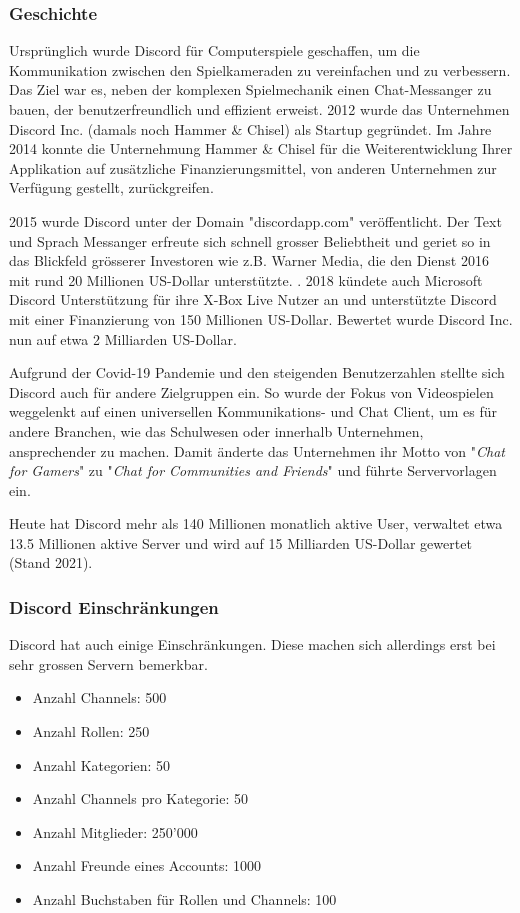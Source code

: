\documentclass[a4paper, table]{article}
\begin{document}
\subsubsection*{Geschichte}
Urspr\"unglich wurde Discord f\"ur Computerspiele geschaffen, um die Kommunikation zwischen den Spielkameraden zu vereinfachen und zu verbessern.
Das Ziel war es, neben der komplexen Spielmechanik einen Chat-Messanger zu bauen, der benutzerfreundlich und effizient erweist.
2012 wurde das Unternehmen Discord Inc. (damals noch Hammer \& Chisel) als Startup gegr\"undet.\autocite{noauthor_discord_2021}
Im Jahre 2014 konnte die Unternehmung Hammer \& Chisel f\"ur die Weiterentwicklung Ihrer Applikation auf zus\"atzliche Finanzierungsmittel, von anderen Unternehmen zur Verfügung gestellt, zurückgreifen.

2015 wurde Discord unter der Domain "discordapp.com" ver\"offentlicht.
Der Text und Sprach Messanger erfreute sich schnell grosser Beliebtheit und geriet so in das Blickfeld grösserer Investoren wie \gls{z.B.} Warner Media, die den Dienst 2016 mit rund 20 Millionen US-Dollar unterstützte. \autocite{noauthor_warner_2022} .
2018 k\"undete auch Microsoft Discord Unterst\"utzung f\"ur ihre X-Box Live Nutzer an und unterst\"utzte Discord mit einer Finanzierung von 150 Millionen US-Dollar. Bewertet wurde Discord Inc. nun auf etwa 2 Milliarden US-Dollar.

Aufgrund der Covid-19 Pandemie und den steigenden Benutzerzahlen stellte sich Discord auch f\"ur andere Zielgruppen ein.
So wurde der Fokus von Videospielen weggelenkt auf einen universellen Kommunikations- und Chat Client, um es f\"ur andere Branchen, wie das Schulwesen oder innerhalb Unternehmen, ansprechender zu machen.
Damit \"anderte das Unternehmen ihr Motto von "\textit{Chat for Gamers}" zu "\textit{Chat for Communities and Friends}" und f\"uhrte Servervorlagen ein.

Heute hat Discord mehr als 140 Millionen monatlich aktive User, verwaltet etwa 13.5 Millionen aktive Server und wird auf 15 Milliarden US-Dollar gewertet (Stand 2021). \autocite{david_curry_discord_2022}

\subsubsection*{Discord Einschr\"ankungen}\label{discord_einschraenkungen}
Discord hat auch einige Einschränkungen.
Diese machen sich allerdings erst bei sehr grossen Servern bemerkbar.\autocite{vultaggio_discord_2022}
\begin{itemize}
    \item Anzahl Channels: 500
    \item Anzahl Rollen: 250
    \item Anzahl Kategorien: 50
    \item Anzahl Channels pro Kategorie: 50
    \item Anzahl Mitglieder: 250'000
    \item Anzahl Freunde eines Accounts: 1000
    \item Anzahl Buchstaben für Rollen und Channels: 100
\end{itemize}
\end{document}
